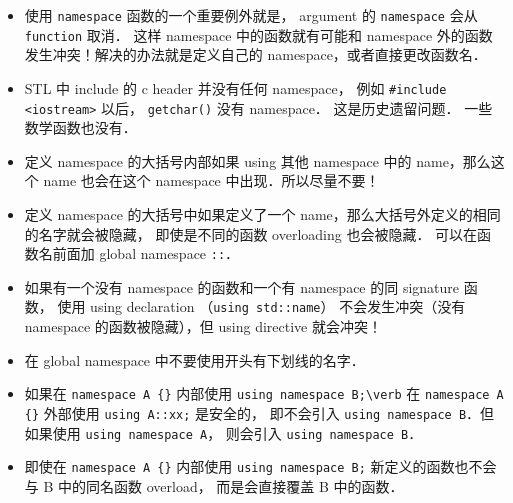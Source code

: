
\begin{issues}
\issueDraft
\end{issues}

\begin{itemize}
\item 使用 \verb|namespace| 函数的一个重要例外就是， argument 的 \verb|namespace| 会从 \verb|function| 取消． 这样 namespace 中的函数就有可能和 namespace 外的函数发生冲突！解决的办法就是定义自己的 namespace，或者直接更改函数名．
\item STL 中 include 的 c header 并没有任何 namespace， 例如 \verb|#include <iostream>| 以后， \verb|getchar()| 没有 namespace． 这是历史遗留问题． 一些数学函数也没有．
\item 定义 namespace 的大括号内部如果 using 其他 namespace 中的 name，那么这个 name 也会在这个 namespace 中出现．所以尽量不要！
\item 定义 namespace 的大括号中如果定义了一个 name，那么大括号外定义的相同的名字就会被隐藏， 即使是不同的函数 overloading 也会被隐藏． 可以在函数名前面加 global namespace \verb|::|．
\item 如果有一个没有 namespace 的函数和一个有 namespace 的同 signature 函数， 使用 using declaration （\verb|using std::name|） 不会发生冲突（没有 namespace 的函数被隐藏），但 using directive 就会冲突！
\item 在 global namespace 中不要使用开头有下划线的名字．
\item 如果在 \verb|namespace A {}| 内部使用 \verb|using namespace B;\verb| 在 \verb|namespace A {}| 外部使用 \verb|using A::xx;| 是安全的， 即不会引入 \verb|using namespace B|．但如果使用 \verb|using namespace A|， 则会引入 \verb|using namespace B|．
\item 即使在 \verb|namespace A {}| 内部使用 \verb|using namespace B;|  新定义的函数也不会与 B 中的同名函数 overload， 而是会直接覆盖 B 中的函数．
\end{itemize}
